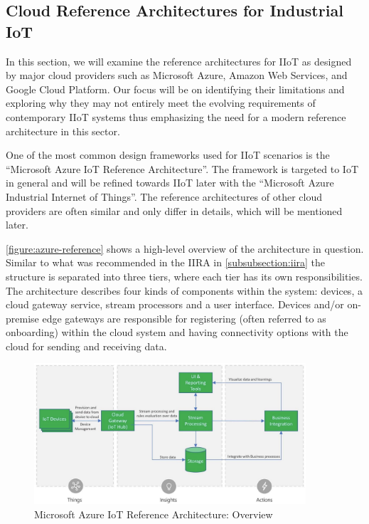 \subsection{Cloud Reference Architectures for Industrial IoT}
\label{subsection:cloud-ref}
    In this section, we will examine the reference architectures for IIoT as designed by major cloud providers such as Microsoft Azure, Amazon Web Services, and Google Cloud Platform. Our focus will be on identifying their limitations and exploring why they may not entirely meet the evolving requirements of contemporary IIoT systems thus emphasizing the need for a modern reference architecture in this sector. \newline 


    One of the most common design frameworks used for IIoT scenarios is the ``Microsoft Azure IoT Reference Architecture''. The framework is targeted to IoT in general and will be refined towards IIoT later with the ``Microsoft Azure Industrial Internet of Things''. The reference architectures of other cloud providers are often similar and only differ in details, which will be mentioned later. 
    
    \autoref{figure:azure-reference} shows a high-level overview of the architecture in question. Similar to what was recommended in the IIRA in \autoref{subsubsection:iira} the structure is separated into three tiers, where each tier has its own responsibilities. The architecture describes four kinds of components within the system: devices, a cloud gateway service, stream processors and a user interface. Devices and/or on-premise edge gateways are responsible for registering (often referred to as onboarding) within the cloud system and having connectivity options with the cloud for sending and receiving data. 
    
    \begin{figure}[htbp]
        \centering
        \includegraphics[width=0.9\textwidth]{img/azure-reference.png}
        \caption{Microsoft Azure IoT Reference Architecture: Overview \cite{microsoft_azure_iot_reference}}
        \label{figure:azure-reference}
    \end{figure}
    
